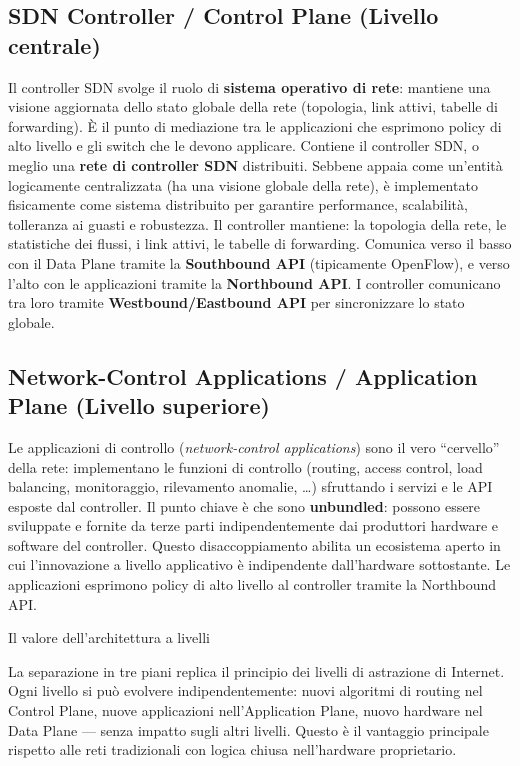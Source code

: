 \documentclass[
  italian,
  openany]{book}
\begin{document}
\subsection{SDN Controller / Control Plane (Livello
centrale)}\label{sdn-controller-control-plane-livello-centrale}

Il controller SDN svolge il ruolo di \textbf{sistema operativo di rete}:
mantiene una visione aggiornata dello stato globale della rete
(topologia, link attivi, tabelle di forwarding). È il punto di
mediazione tra le applicazioni che esprimono policy di alto livello e
gli switch che le devono applicare. Contiene il controller SDN, o meglio
una \textbf{rete di controller SDN} distribuiti. Sebbene appaia come
un'entità logicamente centralizzata (ha una visione globale della rete),
è implementato fisicamente come sistema distribuito per garantire
performance, scalabilità, tolleranza ai guasti e robustezza. Il
controller mantiene: la topologia della rete, le statistiche dei flussi,
i link attivi, le tabelle di forwarding. Comunica verso il basso con il
Data Plane tramite la \textbf{Southbound API} (tipicamente OpenFlow), e
verso l'alto con le applicazioni tramite la \textbf{Northbound API}. I
controller comunicano tra loro tramite \textbf{Westbound/Eastbound API}
per sincronizzare lo stato globale.

\subsection{Network-Control Applications / Application Plane (Livello
superiore)}\label{network-control-applications-application-plane-livello-superiore}

Le applicazioni di controllo (\emph{network-control applications}) sono
il vero ``cervello'' della rete: implementano le funzioni di controllo
(routing, access control, load balancing, monitoraggio, rilevamento
anomalie, \ldots) sfruttando i servizi e le API esposte dal controller.
Il punto chiave è che sono \textbf{unbundled}: possono essere sviluppate
e fornite da terze parti indipendentemente dai produttori hardware e
software del controller. Questo disaccoppiamento abilita un ecosistema
aperto in cui l'innovazione a livello applicativo è indipendente
dall'hardware sottostante. Le applicazioni esprimono policy di alto
livello al controller tramite la Northbound API.

\begin{calloutnote}{Il valore dell’architettura a livelli}

La separazione in tre piani replica il principio dei livelli di
astrazione di Internet. Ogni livello si può evolvere indipendentemente:
nuovi algoritmi di routing nel Control Plane, nuove applicazioni
nell'Application Plane, nuovo hardware nel Data Plane --- senza impatto
sugli altri livelli. Questo è il vantaggio principale rispetto alle reti
tradizionali con logica chiusa nell'hardware proprietario.

\end{calloutnote}
\end{document}
